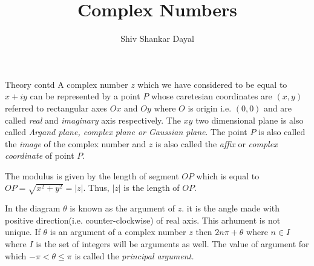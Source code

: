 \documentclass[aspectratio=169,8pt]{beamer}
\title{Complex Numbers}
\author[Shiv Shankar Dayal]{Shiv Shankar Dayal}
\newcounter{counter}
\begin{document}
\begin{frame}
  \titlepage
\end{frame}
\begin{frame}{Theory contd}
  A complex number $z$ which we have considered to be equal to $x + iy$ can be
  represented by a point $P$ whose caretesian coordinates are $(x, y)$ referred
  to rectangular axes $Ox$ and $Oy$ where $O$ is origin i.e. $(0, 0)$ and are
  called \textit{real} and \textit{imaginary} axis respectively. The $xy$ two
  dimensional plane is also called \textit{Argand plane, complex plane or
    Gaussian plane}. The point $P$ is also called the \textit{image} of the
  complex number and $z$ is also called the \textit{affix} or \textit{complex
    coordinate} of point $P.$

  The modulus is given by the length of segment $OP$ which is equal to $OP =
  \sqrt{x^2 + y^2} = |z|.$ Thus, $|z|$ is the length of $OP$.
\end{frame}
\begin{frame}
  \begin{center}
  \end{center}
  In the diagram $\theta$ is known as the argument of $z.$ it is the angle made
  with positive direction(i.e. counter-clockwise) of real axis. This arhument
  is not unique. If $\theta$ is an argument of a complex number $z$ then $2n\pi
  + \theta$ where $n\in I$ where $I$ is the set of integers will be arguments
  as well. The value of argument for which $-\pi<\theta\leq \pi$ is called the
  \textit{principal argument.}
\end{frame}
\end{document}
